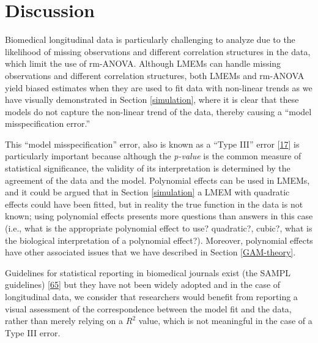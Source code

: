 \documentclass[
]{article}
\begin{document}
\hypertarget{discussion}{%
\section{Discussion}\label{discussion}}

Biomedical longitudinal data is particularly challenging to analyze due to the likelihood of missing observations and different correlation structures in the data, which limit the use of rm-ANOVA. Although LMEMs can handle missing observations and different correlation structures, both LMEMs and rm-ANOVA yield biased estimates when they are used to fit data with non-linear trends as we have visually demonstrated in Section \ref{simulation}, where it is clear that these models do not capture the non-linear trend of the data, thereby causing a ``model misspecification error.''

This ``model misspecification'' error, also is known as a ``Type III'' error {[}\protect\hyperlink{ref-dennis2019}{17}{]} is particularly important because although the \emph{p-value} is the common measure of statistical significance, the validity of its interpretation is determined by the agreement of the data and the model. Polynomial effects can be used in LMEMs, and it could be argued that in Section \ref{simulation} a LMEM with quadratic effects could have been fitted, but in reality the true function in the data is not known; using polynomial effects presents more questions than answers in this case (i.e., what is the appropriate polynomial effect to use? quadratic?, cubic?, what is the biological interpretation of a polynomial effect?). Moreover, polynomial effects have other associated issues that we have described in Section \ref{GAM-theory}.

Guidelines for statistical reporting in biomedical journals exist (the SAMPL guidelines) {[}\protect\hyperlink{ref-lang2015}{65}{]} but they have not been widely adopted and in the case of longitudinal data, we consider that researchers would benefit from reporting a visual assessment of the correspondence between the model fit and the data, rather than merely relying on a \(R^2\) value, which is not meaningful in the case of a Type III error.
\end{document}
